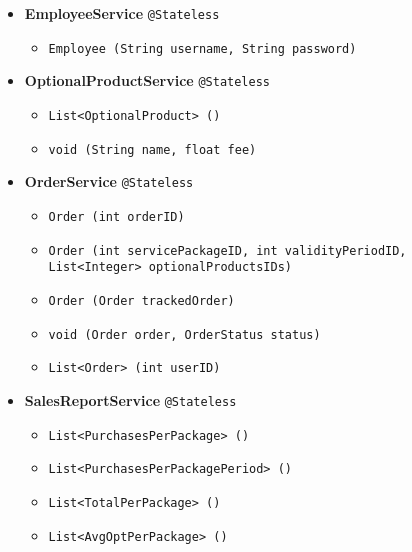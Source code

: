 \begin{itemize}
    \item \textbf{EmployeeService} \texttt{@Stateless}
        \begin{itemize}[label = {$\circ$}]
            \item \texttt{Employee (String username, String password)}
        \end{itemize}
    \item \textbf{OptionalProductService} \texttt{@Stateless}
        \begin{itemize}[label = {$\circ$}]
            \item \texttt{List<OptionalProduct> ()}
            \item \texttt{void (String name, float fee)}
        \end{itemize}
    \item \textbf{OrderService} \texttt{@Stateless}
        \begin{itemize}[label = {$\circ$}, leftmargin = \leftmargin + 1em, itemindent = -1em]
            \item \texttt{Order (int orderID)}
            \item \texttt{Order (int servicePackageID, int validityPeriodID, \\ 
                List<Integer> optionalProductsIDs)}
            \item \texttt{Order (Order trackedOrder)}
            \item \texttt{void (Order order, OrderStatus status)}
            \item \texttt{List<Order> (int userID)}
        \end{itemize}
    \item \textbf{SalesReportService} \texttt{@Stateless}
        \begin{itemize}[label = {$\circ$}]
            \item \texttt{List<PurchasesPerPackage> ()}
            \item \texttt{List<PurchasesPerPackagePeriod> ()}
            \item \texttt{List<TotalPerPackage> ()}
            \item \texttt{List<AvgOptPerPackage> ()}

\end{itemize}
\end{itemize}
